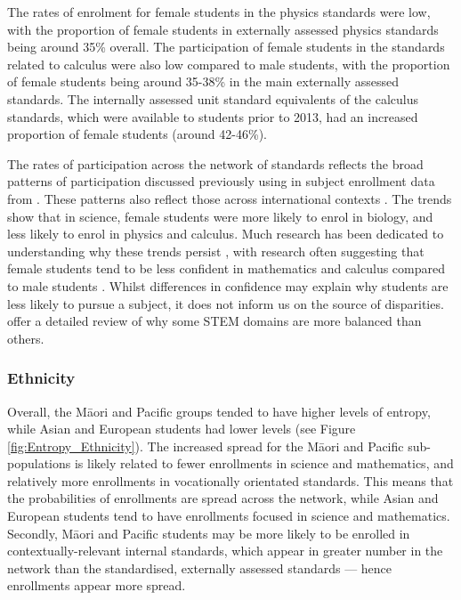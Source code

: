The rates of enrolment for female students in the physics standards were low, with the proportion of female students in externally assessed physics standards being around 35\% overall. The participation of female students in the standards related to calculus were also low compared to male students, with the proportion of female students being around 35-38\% in the main externally assessed standards. The internally assessed unit standard equivalents of the calculus standards, which were available to students prior to 2013, had an increased proportion of female students (around 42-46\%). 

The rates of participation across the network of standards reflects the broad patterns of participation discussed previously using in subject enrollment data from \citet{EducationCounts_2018}. These patterns also reflect those across international contexts \citep{Else_Quest_2013, Sheldrake_2015, NSF, InstituteofPhysics_2013}. The trends show that in science, female students were more likely to enrol in biology, and less likely to enrol in physics and calculus. Much research has been dedicated to understanding why these trends persist \citep{Blickenstaff_2005,cheryan2017some}, with research often suggesting that female students tend to be less confident in mathematics and calculus compared to male students \citep{Hofer_2016, Heilbronner_2012, Simon_2015}. Whilst differences in confidence may explain why students are less likely to pursue a subject, it does not inform us on the source of disparities. \citet{cheryan2017some} offer a detailed review of why some STEM domains are more balanced than others. 


\subsubsection*{Ethnicity}
Overall, the M\={a}ori and Pacific groups tended to have higher levels of entropy, while Asian and European students had lower levels (see Figure \ref{fig:Entropy_Ethnicity}). The increased spread for the M\={a}ori and Pacific sub-populations is likely related to fewer enrollments in science and mathematics, and relatively more enrollments in vocationally orientated standards. This means that the probabilities of enrollments are spread across the network, while Asian and European students tend to have enrollments focused in science and mathematics.  Secondly, M\={a}ori and Pacific students may be more likely to be enrolled in contextually-relevant internal standards, which appear in greater number in the network than the standardised, externally assessed standards --- hence enrollments appear more spread.


